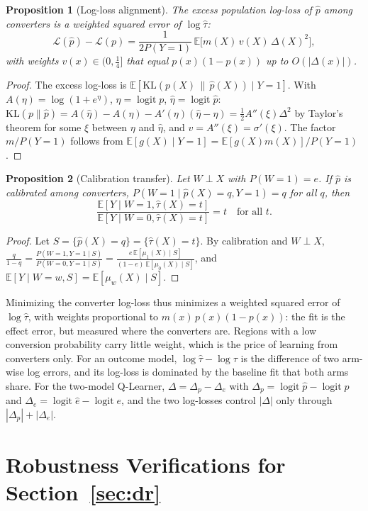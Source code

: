 \documentclass{article}
\newtheorem{proposition}{Proposition}
\newcommand{\logit}{\operatorname{logit}}
\begin{document}
\begin{proposition}[Log-loss alignment]
\label{prop:logloss}
The excess population log-loss of $\hat p$ among converters is a weighted
squared error of $\log\hat\tau$:
\[
  \mathcal L(\hat p)-\mathcal L(p)
  =\frac{1}{2P(Y=1)}\,\mathbb{E}\big[m(X)\,v(X)\,\Delta(X)^2\big],
\]
with weights $v(x)\in(0,\tfrac14]$ that equal $p(x)(1-p(x))$ up to
$O(|\Delta(x)|)$.
\end{proposition}
\begin{proof}
The excess log-loss is $\mathbb{E}[\mathrm{KL}(p(X)\,\|\,\hat p(X))\mid Y=1]$.
With $A(\eta)=\log(1+e^\eta)$, $\eta=\logit p$, $\hat\eta=\logit\hat p$:
$\mathrm{KL}(p\|\hat p)=A(\hat\eta)-A(\eta)-A'(\eta)(\hat\eta-\eta)=\tfrac12A''(\xi)\Delta^2$
by Taylor's theorem for some $\xi$ between $\eta$ and $\hat\eta$, and
$v=A''(\xi)=\sigma'(\xi)$. The factor $m/P(Y=1)$ follows from
$\mathbb{E}[g(X)\mid Y=1]=\mathbb{E}[g(X)m(X)]/P(Y=1)$.
\end{proof}

\begin{proposition}[Calibration transfer]
\label{prop:calibration}
Let $W\perp X$ with $P(W=1)=e$. If $\hat p$ is calibrated among converters,
$P(W=1\mid\hat p(X)=q,Y=1)=q$ for all $q$, then
\[
  \frac{\mathbb{E}[Y\mid W=1,\hat\tau(X)=t]}{\mathbb{E}[Y\mid W=0,\hat\tau(X)=t]}=t\quad\text{for all }t .
\]
\end{proposition}
\begin{proof}
Let $S=\{\hat p(X)=q\}=\{\hat\tau(X)=t\}$. By calibration and $W\perp X$,
$\frac{q}{1-q}=\frac{P(W=1,Y=1\mid S)}{P(W=0,Y=1\mid S)}=\frac{e\,\mathbb{E}[\mu_1(X)\mid S]}{(1-e)\,\mathbb{E}[\mu_0(X)\mid S]}$,
and $\mathbb{E}[Y\mid W=w,S]=\mathbb{E}[\mu_w(X)\mid S]$.
\end{proof}

Minimizing the converter log-loss thus minimizes a weighted squared error
of $\log\hat\tau$, with weights proportional to $m(x)\,p(x)(1-p(x))$: the fit
is the effect error, but measured where the converters are. Regions with a
low conversion probability carry little weight, which is the price of
learning from converters only. For an outcome model,
$\log\hat\tau-\log\tau$ is the difference of two arm-wise log errors, and
its log-loss is dominated by the baseline fit that both arms share. For
the two-model Q-Learner, $\Delta=\Delta_p-\Delta_e$ with
$\Delta_p=\logit\hat p-\logit p$ and $\Delta_e=\logit\hat e-\logit e$, and
the two log-losses
control $|\Delta|$ only through $|\Delta_p|+|\Delta_e|$.

\section{Robustness Verifications for Section~\ref{sec:dr}}
\label{app:verifications}
\end{document}

